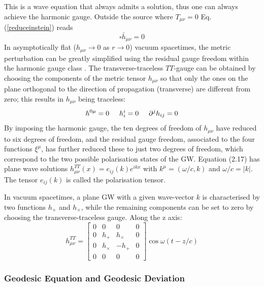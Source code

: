 \documentclass[binding=0.6cm, LaM]{sapthesis}
\begin{document}
	This is a wave equation that always admits a solution, thus one can always achieve the harmonic gauge. 
	Outside the source where $T_{\mu\nu} = 0$ Eq.\,(\ref{reduceinstein}) reads 
		\begin{equation}
			\square {\bar h}_{\mu\nu} = 0
		\end{equation}
	In asymptotically flat ($h_{\mu\nu} \rightarrow 0$ as $r \rightarrow 0$) vacuum spacetimes, 
	the metric perturbation can be greatly simplified using
	the residual gauge freedom within the harmonic gauge class \cite{4}. 
	The transverse-traceless $TT$-gauge can be obtained by choosing the components of the metric tensor $h_{\mu\nu}$
	so that only the ones on the plane orthogonal to the direction of propagation (transverse) 
	are different from zero; this results in $h_{\mu\nu}$ being traceless:
		\begin{equation}
			h^{0\mu} = 0 \hspace*{0.5cm}  h^{i}_i = 0  \hspace*{0.5cm}   {\partial}^jh_{ij} = 0
		\end{equation}
	By imposing the harmonic gauge, the ten degrees of freedom of $h_{\mu\nu}$ 
	have reduced to six degrees of freedom, and the residual gauge freedom,
	associated to the four functions $\xi^{\mu}$, has further reduced these to just two degrees of freedom, 
	which correspond to the two possible polarisation states of the GW. 
	Equation (2.17) has plane wave solutions $h_{\mu\nu}^{TT}(x)=e_{ij}(k)e^{ikx}$ with 
	$k^{\mu}=(\omega/c,k)$ and $\omega/c=|k|$. The tensor $e_{ij}(k)$ is called the polarisation tensor.

	In vacuum spacetimes, a plane GW with a given wave-vector $k$ is characterised 
	by two functions $h_+$ and $h_{\times}$, while the remaining components can be set to zero by
	choosing the transverse-traceless gauge. 
	Along the z axis:
		\begin{equation} 
		h_{\mu\nu}^{TT} = 
		\begin{bmatrix}
		0 & 0 & 0 & 0 \\
		0 & h_{+} & h_{\times} & 0 \\
		0 & h_{\times} & -h_{+} & 0 \\
		0 & 0 & 0 & 0 
		\end{bmatrix}\cos{\omega(t-z/c)}
		\end{equation}

\subsubsection{Geodesic Equation and Geodesic Deviation}
\end{document}
